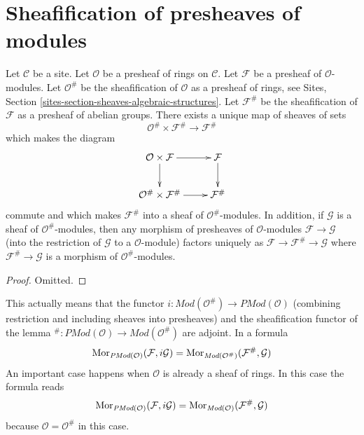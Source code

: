 \section{Sheafification of presheaves of modules}
\label{section-sheafification-presheaves-modules}

\begin{lemma}
\label{lemma-sheafification-presheaf-modules}
Let $\mathcal{C}$ be a site.
Let $\mathcal{O}$ be a presheaf of rings on $\mathcal{C}$.
Let $\mathcal{F}$ be a presheaf of $\mathcal{O}$-modules.
Let $\mathcal{O}^\#$ be the sheafification of $\mathcal{O}$ as a presheaf
of rings, see Sites, Section \ref{sites-section-sheaves-algebraic-structures}.
Let $\mathcal{F}^\#$ be the sheafification of $\mathcal{F}$
as a presheaf of abelian groups. There exists a unique map of
sheaves of sets
$$
\mathcal{O}^\# \times \mathcal{F}^\#
\longrightarrow
\mathcal{F}^\#
$$
which makes the diagram
$$
\xymatrix{
\mathcal{O} \times \mathcal{F} \ar[r] \ar[d] &
\mathcal{F} \ar[d] \\
\mathcal{O}^\# \times \mathcal{F}^\# \ar[r] &
\mathcal{F}^\#
}
$$
commute and which makes $\mathcal{F}^\#$ into a sheaf
of $\mathcal{O}^\#$-modules. In addition, if $\mathcal{G}$
is a sheaf of $\mathcal{O}^\#$-modules, then any morphism
of presheaves of $\mathcal{O}$-modules $\mathcal{F} \to \mathcal{G}$
(into the restriction of $\mathcal{G}$ to a $\mathcal{O}$-module)
factors uniquely as $\mathcal{F} \to \mathcal{F}^\# \to \mathcal{G}$
where $\mathcal{F}^\# \to \mathcal{G}$ is a morphism of
$\mathcal{O}^\#$-modules.
\end{lemma}

\begin{proof}
Omitted.
\end{proof}

\noindent
This actually means that the functor
$i : \textit{Mod}(\mathcal{O}^\#) \to \textit{PMod}(\mathcal{O})$
(combining restriction and including sheaves into presheaves)
and the sheafification functor of the lemma
${}^\# : \textit{PMod}(\mathcal{O}) \to \textit{Mod}(\mathcal{O}^\#)$
are adjoint. In a formula
$$
\mathop{\mathrm{Mor}}\nolimits_{\textit{PMod}(\mathcal{O})}(\mathcal{F}, i\mathcal{G})
=
\mathop{\mathrm{Mor}}\nolimits_{\textit{Mod}(\mathcal{O}^\#)}(\mathcal{F}^\#, \mathcal{G})
$$
An important case happens when $\mathcal{O}$ is already a sheaf of
rings. In this case the formula reads
$$
\mathop{\mathrm{Mor}}\nolimits_{\textit{PMod}(\mathcal{O})}(\mathcal{F}, i\mathcal{G})
=
\mathop{\mathrm{Mor}}\nolimits_{\textit{Mod}(\mathcal{O})}(\mathcal{F}^\#, \mathcal{G})
$$
because $\mathcal{O} = \mathcal{O}^\#$ in this case.


